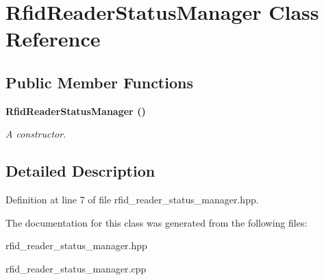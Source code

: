 \section{Rfid\-Reader\-Status\-Manager Class Reference}
\label{classRfidReaderStatusManager}
\subsection*{Public Member Functions}
\begin{CompactItemize}
\item 
\bf{Rfid\-Reader\-Status\-Manager} ()\label{classRfidReaderStatusManager_cad4bf17b6d5a9ecd3f05e2be1160d29}

\begin{CompactList}\small\item\em A constructor. \item\end{CompactList}\end{CompactItemize}


\subsection{Detailed Description}




Definition at line 7 of file rfid\_\-reader\_\-status\_\-manager.hpp.

The documentation for this class was generated from the following files:\begin{CompactItemize}
\item 
rfid\_\-reader\_\-status\_\-manager.hpp\item 
rfid\_\-reader\_\-status\_\-manager.cpp\end{CompactItemize}
